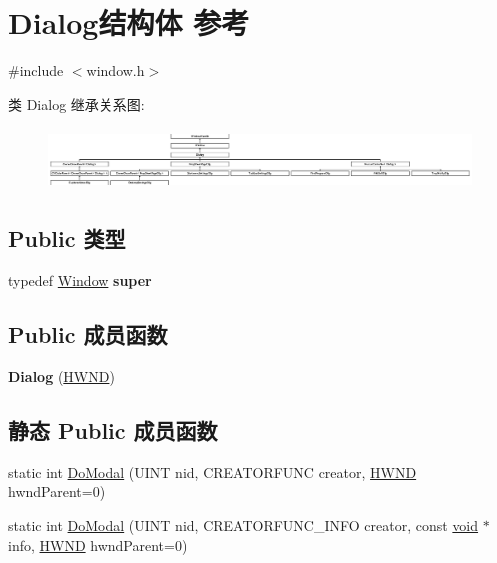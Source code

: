\hypertarget{struct_dialog}{}\section{Dialog结构体 参考}
\label{struct_dialog}


{\ttfamily \#include $<$window.\+h$>$}

类 Dialog 继承关系图\+:\begin{figure}[H]
\begin{center}
\leavevmode
\includegraphics[height=1.643836cm]{struct_dialog}
\end{center}
\end{figure}
\subsection*{Public 类型}
\begin{DoxyCompactItemize}
\item 
\mbox{\label{struct_dialog_a9292840f5bca89c263483255104782d3}} 
typedef \hyperlink{struct_window}{Window} {\bfseries super}
\end{DoxyCompactItemize}
\subsection*{Public 成员函数}
\begin{DoxyCompactItemize}
\item 
\mbox{\label{struct_dialog_a2378ad158f672f7c7086bb47bd4d24ad}} 
{\bfseries Dialog} (\hyperlink{interfacevoid}{H\+W\+ND})
\end{DoxyCompactItemize}
\subsection*{静态 Public 成员函数}
\begin{DoxyCompactItemize}
\item 
static int \hyperlink{struct_dialog_a68e10e3226c95864b8570595adc6a39c}{Do\+Modal} (U\+I\+NT nid, C\+R\+E\+A\+T\+O\+R\+F\+U\+NC creator, \hyperlink{interfacevoid}{H\+W\+ND} hwnd\+Parent=0)
\item 
static int \hyperlink{struct_dialog_a70b9e81d26f712c4079ae96c9009edbb}{Do\+Modal} (U\+I\+NT nid, C\+R\+E\+A\+T\+O\+R\+F\+U\+N\+C\+\_\+\+I\+N\+FO creator, const \hyperlink{interfacevoid}{void} $\ast$info, \hyperlink{interfacevoid}{H\+W\+ND} hwnd\+Parent=0)
\end{DoxyCompactItemize}
